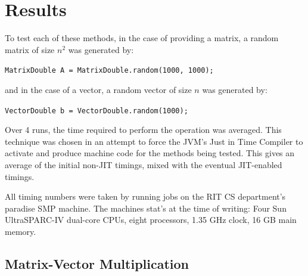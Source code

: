 \documentclass{dependencies/acm_proc_article-sp}
\begin{document}
\section{Results}

To test each of these methods, in the case of providing a matrix, a random matrix of size $n^2$ was generated by:

{\tt MatrixDouble A = MatrixDouble.random(1000, 1000); }

and in the case of a vector, a random vector of size $n$ was generated by:

{\tt VectorDouble b = VectorDouble.random(1000);}

Over 4 runs, the time required to perform the operation was averaged.
This technique was chosen in an attempt to force the JVM's Just in Time
Compiler to activate and produce machine code for the methods
being tested. This gives an average of the initial non-JIT timings, mixed
with the eventual JIT-enabled timings.

All timing numbers were taken by running jobs on the RIT CS department's
paradise SMP machine. The machines stat's at the time of writing: 
Four Sun UltraSPARC-IV dual-core CPUs, eight processors, 1.35 GHz clock, 16 GB
main memory.
\subsection{Matrix-Vector Multiplication}
\end{document}
